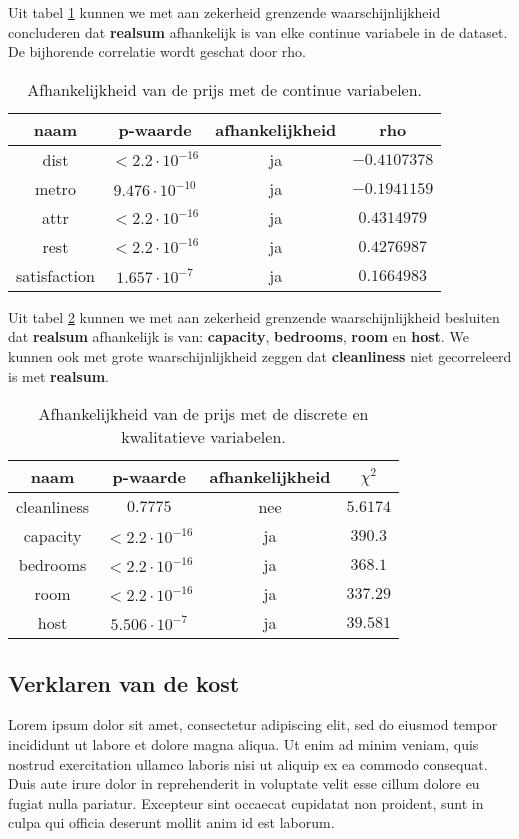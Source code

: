 \documentclass[a4paper]{kulakarticle}
\begin{document}
	Uit tabel \ref{continue variabelen afhankelijkheid} kunnen we met aan zekerheid grenzende waarschijnlijkheid concluderen dat \textbf{realsum} afhankelijk is van elke continue variabele in de dataset. De bijhorende correlatie wordt geschat door rho.
	\begin{table}
		\begin{tabular}{c|c|c|c }
			naam & p-waarde & afhankelijkheid & rho\\
			\hline
			\hline
			dist & $< 2.2 \cdot 10^{-16} $&ja& $-0.4107378$ \\
			metro &$ 9.476\cdot 10^{-10}$& ja& $-0.1941159$ \\ 
			attr &$ < 2.2\cdot 10^{-16}$& ja&$0.4314979 $ \\
			rest &$ < 2.2\cdot 10^{-16}$& ja&$0.4276987 $ \\
			satisfaction &$ 1.657\cdot 10^{-7}$& ja&$0.1664983 $ \\
		\end{tabular}
		\caption{Afhankelijkheid van de prijs met de continue variabelen.}
		\label{continue variabelen afhankelijkheid}
	\end{table}
	Uit tabel \ref{discrete variabelen afhankelijkheid} kunnen we met aan zekerheid grenzende waarschijnlijkheid besluiten dat \textbf{realsum} afhankelijk is van: \textbf{capacity}, \textbf{bedrooms}, \textbf{room} en \textbf{host}. We kunnen ook met grote waarschijnlijkheid zeggen dat \textbf{cleanliness} niet gecorreleerd is met \textbf{realsum}. 
	\begin{table}[h]
		\begin{tabular}{c|c|c|c }
			naam & p-waarde & afhankelijkheid & $\chi ^2$\\
			\hline
			\hline
			cleanliness & $0.7775$&nee& $5.6174$ \\
			capacity &$ < 2.2\cdot 10^{-16}$& ja& $390.3$ \\ 
			bedrooms &$ < 2.2\cdot 10^{-16}$& ja&$368.1 $ \\
			room &$ < 2.2\cdot 10^{-16}$& ja&$ 337.29$ \\
			host &$ 5.506\cdot 10^{-7}$& ja&$39.581 $ \\
		\end{tabular}
		\caption{Afhankelijkheid van de prijs met de discrete en kwalitatieve variabelen.}
		\label{discrete variabelen afhankelijkheid}
	\end{table}
	
	
	
	\subsection{Verklaren van de kost}
	Lorem ipsum dolor sit amet, consectetur adipiscing elit, sed do eiusmod tempor incididunt ut labore et dolore magna aliqua. Ut enim ad minim veniam, quis nostrud exercitation ullamco laboris nisi ut aliquip ex ea commodo consequat. Duis aute irure dolor in reprehenderit in voluptate velit esse cillum dolore eu fugiat nulla pariatur. Excepteur sint occaecat cupidatat non proident, sunt in culpa qui officia deserunt mollit anim id est laborum.
	
\end{document}
